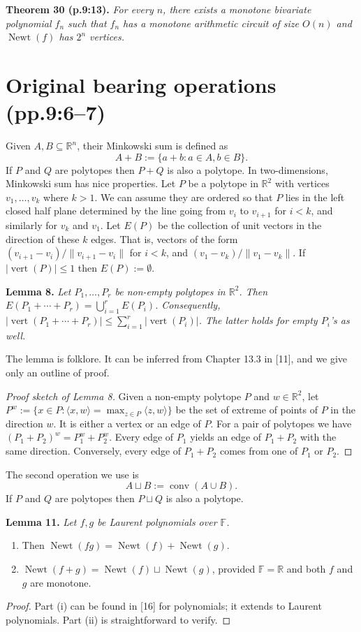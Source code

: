 \documentclass[10pt,a4paper]{article}
\newcommand{\Newt}{\operatorname{Newt}}
\newcommand{\conv}{\operatorname{conv}}
\newcommand{\vertset}{\operatorname{vert}}
\newenvironment{sourceresult}[1]{\par\medskip\noindent\textbf{#1.}\itshape}{\par\medskip}
\begin{document}
\begin{sourceresult}{Theorem 30 (p.9:13)}
For every $n$, there exists a monotone bivariate polynomial $f_n$ such that $f_n$ has a monotone arithmetic circuit of size $O(n)$ and $\Newt(f)$ has $2^n$ vertices.
\end{sourceresult}

\section*{Original bearing operations (pp.9:6--7)}
Given $A,B\subseteq\mathbb R^n$, their Minkowski sum is defined as
\[A+B:=\{a+b:a\in A,b\in B\}.\]
If $P$ and $Q$ are polytopes then $P+Q$ is also a polytope. In two-dimensions, Minkowski sum has nice properties. Let $P$ be a polytope in $\mathbb R^2$ with vertices $v_1,\ldots,v_k$ where $k>1$. We can assume they are ordered so that $P$ lies in the left closed half plane determined by the line going from $v_i$ to $v_{i+1}$ for $i<k$, and similarly for $v_k$ and $v_1$. Let $E(P)$ be the collection of unit vectors in the direction of these $k$ edges. That is, vectors of the form $(v_{i+1}-v_i)/\|v_{i+1}-v_i\|$ for $i<k$, and $(v_1-v_k)/\|v_1-v_k\|$. If $|\vertset(P)|\le1$ then $E(P):=\emptyset$.
\begin{sourceresult}{Lemma 8}
Let $P_1,\ldots,P_r$ be non-empty polytopes in $\mathbb R^2$. Then $E(P_1+\cdots+P_r)=\bigcup_{i=1}^r E(P_i)$. Consequently, $|\vertset(P_1+\cdots+P_r)|\le\sum_{i=1}^r|\vertset(P_i)|$. The latter holds for empty $P_i$'s as well.
\end{sourceresult}
The lemma is folklore. It can be inferred from Chapter 13.3 in [11], and we give only an outline of proof.
\begin{proof}[Proof sketch of Lemma 8]
Given a non-empty polytope $P$ and $w\in\mathbb R^2$, let $P^w:=\{x\in P:\langle x,w\rangle=\max_{z\in P}\langle z,w\rangle\}$ be the set of extreme of points of $P$ in the direction $w$. It is either a vertex or an edge of $P$. For a pair of polytopes we have $(P_1+P_2)^w=P_1^w+P_2^w$. Every edge of $P_1$ yields an edge of $P_1+P_2$ with the same direction. Conversely, every edge of $P_1+P_2$ comes from one of $P_1$ or $P_2$.
\end{proof}
The second operation we use is
\[A\sqcup B:=\conv(A\cup B).\]
If $P$ and $Q$ are polytopes then $P\sqcup Q$ is also a polytope.
\begin{sourceresult}{Lemma 11}
Let $f,g$ be Laurent polynomials over $\mathbb F$.
\begin{enumerate}
\item[(i)] Then $\Newt(fg)=\Newt(f)+\Newt(g)$.
\item[(ii)] $\Newt(f+g)=\Newt(f)\sqcup\Newt(g)$, provided $\mathbb F=\mathbb R$ and both $f$ and $g$ are monotone.
\end{enumerate}
\end{sourceresult}
\begin{proof}
Part (i) can be found in [16] for polynomials; it extends to Laurent polynomials. Part (ii) is straightforward to verify.
\end{proof}
\end{document}
